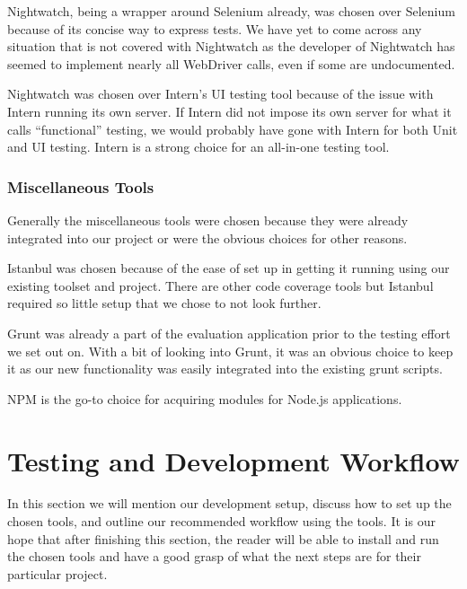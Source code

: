 \documentclass[12pt]{ucthesis}
\begin{document}
Nightwatch, being a wrapper around Selenium already, was chosen over Selenium because of its concise way to express tests. We have yet to come across any situation that is not covered with Nightwatch as the developer of Nightwatch has seemed to implement nearly all WebDriver calls, even if some are undocumented.

Nightwatch was chosen over Intern's UI testing tool because of the issue with Intern running its own server. If Intern did not impose its own server for what it calls ``functional'' testing, we would probably have gone with Intern for both Unit and UI testing. Intern is a strong choice for an all-in-one testing tool.

\subsection{Miscellaneous Tools}
Generally the miscellaneous tools were chosen because they were already integrated into our project or were the obvious choices for other reasons.

Istanbul was chosen because of the ease of set up in getting it running using our existing toolset and project. There are other code coverage tools but Istanbul required so little setup that we chose to not look further.

Grunt was already a part of the evaluation application prior to the testing effort we set out on. With a bit of looking into Grunt, it was an obvious choice to keep it as our new functionality was easily integrated into the existing grunt scripts.

NPM is the go-to choice for acquiring modules for Node.js applications.

\chapter{Testing and Development Workflow}
In this section we will mention our development setup, discuss how to set up the chosen tools, and outline our recommended workflow using the tools. It is our hope that after finishing this section, the reader will be able to install and run the chosen tools and have a good grasp of what the next steps are for their particular project.
\end{document}
